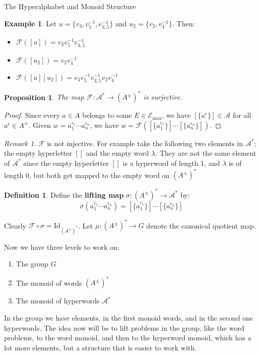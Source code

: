 \documentclass{article}
\newtheorem{proposition}[theorem]{Proposition}
\theoremstyle{definition}
\newtheorem{definition}[theorem]{Definition}
\newtheorem{example}[theorem]{Example}
\theoremstyle{remark}
\newtheorem{remark}[theorem]{Remark}
\theoremstyle{theorem}
\theoremstyle{definition}
\begin{document}
\begin{section}{The Hyperalphabet and Monoid Structure}
\begin{example}
Let $u = \{v_3, v_5^{-1}, e_{3,5}^{-1}\}$ and $u_2 = \{v_2, v_4^{-1}\}$. Then:
\begin{itemize}
    \item $\mathcal{F}([u]) = v_3 v_5^{-1} e_{3,5}^{-1}$
    \item $\mathcal{F}([u_2]) = v_2 v_4^{-1}$
    \item $\mathcal{F}([u][u_2]) = v_3 v_5^{-1} e_{3,5}^{-1} v_2 v_4^{-1}$
\end{itemize}
\end{example}

\begin{proposition}
The map $\mathcal{F}: \mathcal{A}^* \to (A^{\pm})^*$ is surjective.
\end{proposition}
\begin{proof}
Since every $a \in A$ belongs to some $E \in \mathcal{E}_{\max}$, we have $[\{a^{\epsilon}\}] \in \mathcal{A}$ for all $a^{\epsilon} \in A^{\pm}$. Given $w = a_1^{\epsilon_1} \cdots a_n^{\epsilon_n}$, we have $w = \mathcal{F}([\{a_1^{\epsilon_1}\}] \cdots [\{a_n^{\epsilon_n}\}])$.
\end{proof}

\begin{remark}
    $\mathcal{F}$ is not injective. For example take the following two elements in $\mathcal{A}^*$: the empty hyperletter $[]$ and the empty word $\lambda$. They are not the same element of $\mathcal{A}^*$ since the empty hyperletter $[]$ is a hyperword of length 1, and $\lambda$ is of length 0, but both get mapped to the empty word on $(A^{\pm})^*$
\end{remark}

\begin{definition}
Define the \textbf{lifting map} $\sigma: (A^{\pm})^* \to \mathcal{A}^*$ by:
$$\sigma(a_1^{\epsilon_1} \cdots a_n^{\epsilon_n}) = [\{a_1^{\epsilon_1}\}] \cdots [\{a_n^{\epsilon_n}\}]$$
\end{definition}

Clearly $\mathcal{F} \circ \sigma = \text{Id}_{(A^{\pm})^*}$. Let $\mu: (A^{\pm})^* \to G$ denote the canonical quotient map.

Now we have three levels to work on:
\begin{enumerate}
    \item The group $G$ 
    \item The monoid of words $(A^{\pm})^*$
    \item The monoid of hyperwords $\mathcal{A}^*$
\end{enumerate}

In the group we have elements, in the first monoid words, and in the second one hyperwords. The idea now will be to lift problems in the group, like the word problems, to the word monoid, and then to the hyperword monoid, which has a lot more elements, but a structure that is easier to work with.

\end{section}
\end{document}
